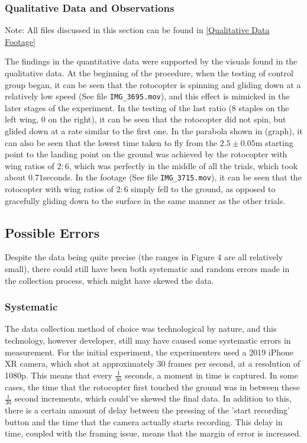 \documentclass[]{article}
\theoremstyle{definition}
\begin{document}
\subsubsection{Qualitative Data and Observations} \label{Qualitative Data}
Note: All files discussed in this section can be found in \ref{Qualitative Data Footage}

The findings in the quantitative data were supported by the visuals found in the qualitative data. At the beginning of the procedure, when the testing of control group began, it can be seen that the rotocopter is spinning and gliding down at a relatively low speed (See file \verb|IMG_3695.mov|), and this effect is mimicked in the later stages of the experiment. In the testing of the last ratio (8 staples on the left wing, 0 on the right), it can be seen that the rotocopter did not spin, but glided down at a rate similar to the first one. In the parabola shown in (graph), it can also be seen that the lowest time taken to fly from the $2.5\pm0.05$m starting point to the landing point on the ground was achieved by the rotocopter with wing ratios of $2:6$, which was perfectly in the middle of all the trials, which took about $0.71$seconds. In the footage (See file \verb|IMG_3715.mov|), it can be seen that the rotocopter with wing ratios of $2:6$ simply fell to the ground, as opposed to gracefully gliding down to the surface in the same manner as the other trials.

\subsection{Possible Errors}
Despite the data being quite precise (the ranges in Figure 4 are all relatively small), there could still have been both systematic and random errors made in the collection process, which might have skewed the data.

\label{Systematic Errors}
\subsubsection{Systematic}

The data collection method of choice was technological by nature, and this technology, however developer, still may have caused some systematic errors in measurement. For the initial experiment, the experimenters used a 2019 iPhone XR camera, which shot at approximately 30 frames per second, at a resolution of 1080p. This means that every $\frac{1}{30}$ seconds, a moment in time is captured. In some cases, the time that the rotocopter first touched the ground was in between these $\frac{1}{30}$ second increments, which could've skewed the final data. In addition to this, there is a certain amount of delay between the pressing of the 'start recording' button and the time that the camera actually starts recording. This delay in time, coupled with the framing issue, means that the margin of error is increased.
\end{document}

